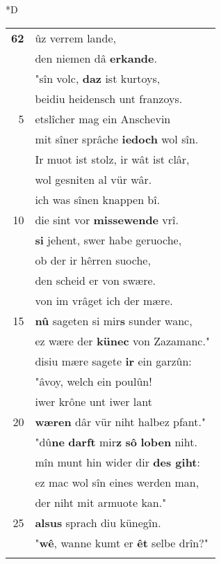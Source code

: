 \documentclass[8pt,a4paper,notitlepage]{article}
\begin{document}
\begin{table}[ht]
\begin{minipage}[t]{0.5\linewidth}
\small
\begin{center}*D
\end{center}
\begin{tabular}{rl}
\textbf{62} & ûz verrem lande,\\ 
 & den niemen dâ \textbf{erkande}.\\ 
 & "sîn volc, \textbf{daz} ist kurtoys,\\ 
 & beidiu heidensch unt franzoys.\\ 
5 & etslîcher mag ein Anschevin\\ 
 & mit sîner sprâche \textbf{iedoch} wol sîn.\\ 
 & Ir muot ist stolz, ir wât ist clâr,\\ 
 & wol gesniten al vür wâr.\\ 
 & ich was sînen knappen bî.\\ 
10 & die sint vor \textbf{missewende} vrî.\\ 
 & \textbf{si} jehent, swer habe geruoche,\\ 
 & ob der ir hêrren suoche,\\ 
 & den scheid er von swære.\\ 
 & von im vrâget ich der mære.\\ 
15 & \textbf{nû} sageten si mir\textbf{s} sunder wanc,\\ 
 & ez wære der \textbf{künec} von Zazamanc."\\ 
 & disiu mære sagete \textbf{ir} ein garzûn:\\ 
 & "âvoy, welch ein poulûn!\\ 
 & iwer krône unt iwer lant\\ 
20 & \textbf{wæren} dâr vür niht halbez pfant."\\ 
 & "dû\textbf{ne} \textbf{darft} mir\textbf{z} \textbf{sô} \textbf{loben} niht.\\ 
 & mîn munt hin wider dir \textbf{des giht}:\\ 
 & ez mac wol sîn eines werden man,\\ 
 & der niht mit armuote kan."\\ 
25 & \textbf{alsus} sprach diu künegîn.\\ 
 & "\textbf{wê}, wanne kumt er \textbf{êt} selbe drîn?"\\ 
 & \textbf{\begin{large}D\end{large}en} garzûn si des vrâgen bat.\\ 

\end{tabular}
\end{minipage}
\end{table}
\end{document}
